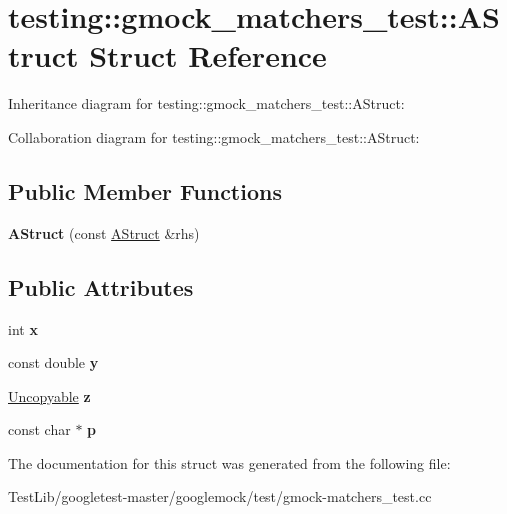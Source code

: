 \hypertarget{structtesting_1_1gmock__matchers__test_1_1AStruct}{}\section{testing\+:\+:gmock\+\_\+matchers\+\_\+test\+:\+:A\+Struct Struct Reference}
\label{structtesting_1_1gmock__matchers__test_1_1AStruct}


Inheritance diagram for testing\+:\+:gmock\+\_\+matchers\+\_\+test\+:\+:A\+Struct\+:


Collaboration diagram for testing\+:\+:gmock\+\_\+matchers\+\_\+test\+:\+:A\+Struct\+:
\subsection*{Public Member Functions}
\begin{DoxyCompactItemize}
\item 
\mbox{\label{structtesting_1_1gmock__matchers__test_1_1AStruct_ac5b9c0054e929e8883e13123aef50ff3}} 
{\bfseries A\+Struct} (const \hyperlink{structtesting_1_1gmock__matchers__test_1_1AStruct}{A\+Struct} \&rhs)
\end{DoxyCompactItemize}
\subsection*{Public Attributes}
\begin{DoxyCompactItemize}
\item 
\mbox{\label{structtesting_1_1gmock__matchers__test_1_1AStruct_a539eea02599ad34ff2bf90cc2c1adf26}} 
int {\bfseries x}
\item 
\mbox{\label{structtesting_1_1gmock__matchers__test_1_1AStruct_a08b8592764aa4775c3d5a3542470f8bb}} 
const double {\bfseries y}
\item 
\mbox{\label{structtesting_1_1gmock__matchers__test_1_1AStruct_a45b1006e4a7b21037610a385dcae6d8c}} 
\hyperlink{classtesting_1_1gmock__matchers__test_1_1Uncopyable}{Uncopyable} {\bfseries z}
\item 
\mbox{\label{structtesting_1_1gmock__matchers__test_1_1AStruct_a65755db7d763d53c13483bb520f1efcd}} 
const char $\ast$ {\bfseries p}
\end{DoxyCompactItemize}


The documentation for this struct was generated from the following file\+:\begin{DoxyCompactItemize}
\item 
Test\+Lib/googletest-\/master/googlemock/test/gmock-\/matchers\+\_\+test.\+cc\end{DoxyCompactItemize}
